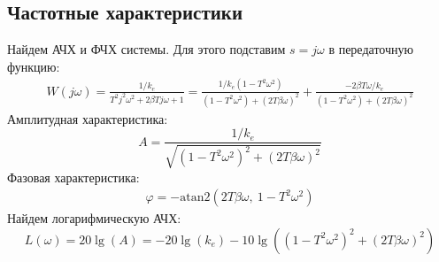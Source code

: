 \subsection{Частотные характеристики}
Найдем АЧХ и ФЧХ системы. Для этого подставим $s = j\omega$ в передаточную функцию:
\begin{eqnarray}
    W(j\omega) =  \frac{1/k_e}{T^2j^2\omega^2 + 2\beta Tj\omega + 1} = \frac{1/k_e(1 - T^2\omega^2)}{(1 - T^2\omega^2) + (2T\beta\omega)^2} + \frac{-2\beta T\omega/k_e}{(1 - T^2\omega^2) + (2T\beta\omega)^2}
\end{eqnarray}
Амплитудная характеристика:
\begin{equation}
    A = \frac{1/k_e}{\sqrt{(1 - T^2\omega^2)^2 + (2T\beta\omega)^2}}
\end{equation}
Фазовая характеристика:
\begin{eqnarray}
    \varphi = -\text{atan2}\left(2T\beta\omega,~1 - T^2\omega^2\right)
\end{eqnarray}
Найдем логарифмическую АЧХ: 
\begin{equation}
    L(\omega) = 20\lg(A) = -20\lg(k_e) - 10\lg((1 - T^2\omega^2)^2 + (2T\beta\omega)^2)
\end{equation}

